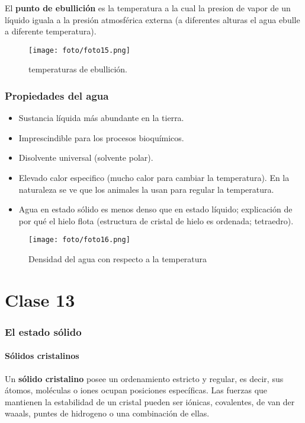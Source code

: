 \documentclass[]{article}
\begin{document}
El \textbf{punto de ebullición} es la temperatura a la cual la presion de vapor de un líquido iguala a la presión atmosférica externa (a diferentes alturas el agua ebulle a diferente temperatura).

\begin{figure}[H]
\center
\texttt{[image: foto/foto15.png]}
\caption{temperaturas de ebullición.}
\end{figure}



\section{Propiedades del agua}

\begin{itemize}
	\item Sustancia líquida más abundante en la tierra.
	\item Imprescindible para los procesos bioquímicos.
	\item Disolvente universal (solvente polar).
	\item Elevado calor especifico (mucho calor para cambiar la temperatura). En la naturaleza se ve que los animales la usan para regular la temperatura.
	\item Agua en estado sólido es menos denso que en estado líquido; explicación de por qué el hielo flota (estructura de cristal de hielo es ordenada; tetraedro).
\end{itemize}

\begin{figure}[H]
\center
\texttt{[image: foto/foto16.png]}
\caption{Densidad del agua con respecto a la temperatura}
\end{figure}


\part{Clase 13}



\section{El estado sólido}



\subsection{Sólidos cristalinos}
Un \textbf{sólido cristalino} posee un ordenamiento estricto y regular, es decir, sus átomos, moléculas o iones ocupan posiciones específicas. Las fuerzas que mantienen la estabilidad de un cristal pueden ser iónicas, covalentes, de van der waaals, puntes de hidrogeno o una combinación de ellas.
\end{document}
